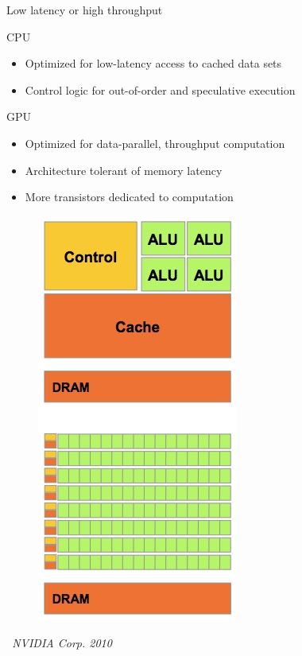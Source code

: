\documentclass[aspectratio=169,12pt]{beamer}
\begin{document}
\begin{frame}{Low latency or high throughput}
  \begin{minipage}{.7\textwidth}
    CPU
    \begin{itemize}
    \item Optimized for low-latency access to cached data sets
    \item Control logic for out-of-order and speculative execution
    \end{itemize}
    GPU
    \begin{itemize}
    \item Optimized for data-parallel, throughput computation
    \item Architecture tolerant of memory latency
    \item More transistors dedicated to computation
    \end{itemize}
  \end{minipage}
  \begin{minipage}{.29\textwidth}
    \begin{figure}
      \centering
      \includegraphics[height=.75\textheight]{layout.jpg} \\
    \end{figure}
    \vspace{-\baselineskip}
    \raggedleft
    \scriptsize
    \emph{\textcopyright\ NVIDIA Corp. 2010}
  \end{minipage}
\end{frame}
\end{document}

